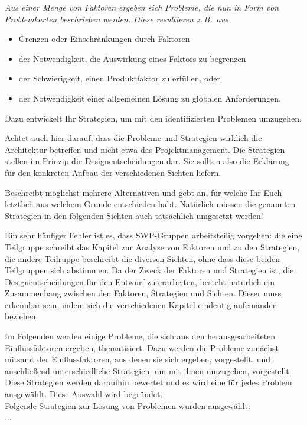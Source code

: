 \documentclass[enabledeprecatedfontcommands,fontsize=12pt,paper=a4,twoside]{scrartcl}
\begin{document}
{ \em Aus einer Menge von Faktoren ergeben sich Probleme, die nun in
  Form von Problemkarten beschrieben werden. Diese resultieren z.\,B.\
  aus
  \begin{itemize}
    \item Grenzen oder Einschränkungen durch Faktoren
    \item der Notwendigkeit, die Auswirkung eines Faktors zu begrenzen
    \item der Schwierigkeit, einen Produktfaktor zu erfüllen, oder
    \item der Notwendigkeit einer allgemeinen Lösung zu globalen
      Anforderungen.
  \end{itemize}
  Dazu entwickelt Ihr Strategien, um mit den identifizierten Problemen
  umzugehen.

  Achtet auch hier darauf, dass die Probleme und Strategien wirklich
  die Architektur betreffen und nicht etwa das Projektmanagement. Die
  Strategien stellen im Prinzip die Designentscheidungen dar. Sie
  sollten also die Erklärung für den konkreten Aufbau der
  verschiedenen Sichten liefern.

  Beschreibt möglichst mehrere Alternativen und gebt an, für welche
  Ihr Euch letztlich aus welchem Grunde entschieden habt. Natürlich
  müssen die genannten Strategien in den folgenden Sichten auch
  tatsächlich umgesetzt werden!

  Ein sehr häufiger Fehler ist es, dass SWP-Gruppen arbeitsteilig
  vorgehen: die eine Teilgruppe schreibt das Kapitel zur Analyse von
  Faktoren und zu den Strategien, die andere Teilruppe beschreibt die
  diversen Sichten, ohne dass diese beiden Teilgruppen sich abstimmen.
  Da der Zweck der Faktoren und Strategien ist, die
  Designentscheidungen für den Entwurf zu erarbeiten, besteht
  natürlich ein Zusammenhang zwischen den Faktoren, Strategien und
  Sichten. Dieser muss erkennbar sein, indem sich die verschiedenen
  Kapitel eindeutig aufeinander beziehen.
}


Im Folgenden werden einige Probleme, die sich aus den herausgearbeiteten Einflussfaktoren ergeben, thematisiert. Dazu werden die Probleme zunächst mitsamt der Einflussfaktoren, aus denen sie sich ergeben, vorgestellt, und anschließend unterschiedliche Strategien, um mit ihnen umzugehen, vorgestellt. \\ Diese Strategien werden daraufhin bewertet und es wird eine für jedes Problem ausgewählt. Diese Auswahl wird begründet. \\ 
Folgende Strategien zur Lösung von Problemen wurden ausgewählt: \\
...
\end{document}
